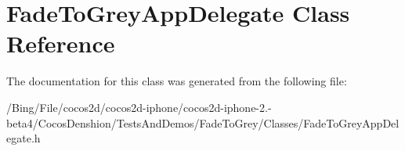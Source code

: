\hypertarget{interface_fade_to_grey_app_delegate}{\section{Fade\-To\-Grey\-App\-Delegate Class Reference}
\label{interface_fade_to_grey_app_delegate}
}


The documentation for this class was generated from the following file\-:\begin{DoxyCompactItemize}
\item 
/\-Bing/\-File/cocos2d/cocos2d-\/iphone/cocos2d-\/iphone-\/2.-\/beta4/\-Cocos\-Denshion/\-Tests\-And\-Demos/\-Fade\-To\-Grey/\-Classes/Fade\-To\-Grey\-App\-Delegate.\-h\end{DoxyCompactItemize}
